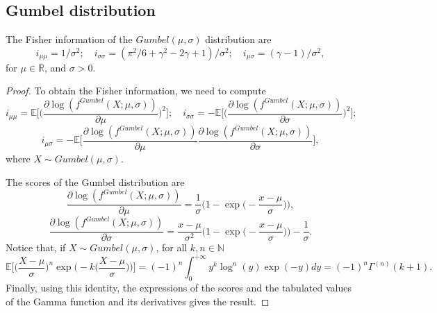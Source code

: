 \documentclass{article}
\newcommand{\mb}{\mathbb}
\newcommand{\1}{\mathds{1}}
\theoremstyle{definition}
\begin{document}
\subsection{Gumbel distribution}\label{sec:gumbel_fisher}

    The Fisher information of the $Gumbel(\mu,\sigma)$ distribution are
\begin{equation*}
    i_{\mu\mu} = 1/\sigma^2; \quad i_{\sigma \sigma} = (\pi^2/6+\gamma^2 - 2 \gamma +1)/\sigma^2; \quad i_{\mu \sigma} = (\gamma - 1)/\sigma^2,
\end{equation*}
for $\mu \in \mb{R}$, and $\sigma>0$.

\begin{proof}
    To obtain the Fisher information, we need to compute
    \begin{equation*}
        i_{\mu\mu} = \mb{E} \Big[\Big(\frac{\partial \log(f^{Gumbel}(X;\mu,\sigma))}{\partial \mu}\Big)^2\Big]; \quad i_{\sigma\sigma} = -\mb{E} \Big[\Big(\frac{\partial \log(f^{Gumbel}(X;\mu,\sigma))}{\partial \sigma}\Big)^2\Big];
        \end{equation*}
        \begin{equation*}\label{eq:info_gev}
        i_{\mu\sigma} = -\mb{E} \Big[\frac{\partial \log(f^{Gumbel}(X;\mu,\sigma))}{\partial \mu}\frac{\partial \log(f^{Gumbel}(X;\mu,\sigma))}{\partial \sigma}\Big],
    \end{equation*}
where $X \sim Gumbel(\mu,\sigma)$.

\noindent The scores of the Gumbel distribution are
    \begin{equation*}
        \frac{\partial \log(f^{Gumbel}(X;\mu,\sigma))}{\partial \mu} = \frac{1}{\sigma}\Big(1-\exp\Big(-\frac{x-\mu}{\sigma}\Big)\Big),
    \end{equation*}
    \begin{equation*}
        \frac{\partial \log(f^{Gumbel}(X;\mu,\sigma))}{\partial \sigma} = \frac{x-\mu}{\sigma^2}\Big(1-\exp\Big(-\frac{x-\mu}{\sigma}\Big)\Big)-\frac{1}{\sigma}.
    \end{equation*}
    Notice that, if $X\sim Gumbel(\mu,\sigma)$, for all $k,n\in \mb{N}$
    \begin{equation*}
        \mb{E}\Big[\Big(\frac{X-\mu}{\sigma}\Big)^n \exp\Big(-k\Big(\frac{X-\mu}{\sigma}\Big)\Big)\Big] 
        = (-1)^n\int_0^{+\infty} y^k \log^n(y)\exp(-y)dy = (-1)^n\Gamma^{(n)}(k+1).
    \end{equation*}
    Finally, using this identity, the expressions of the scores and the tabulated values of the Gamma function and its derivatives gives the result.
\end{proof}
\end{document}
